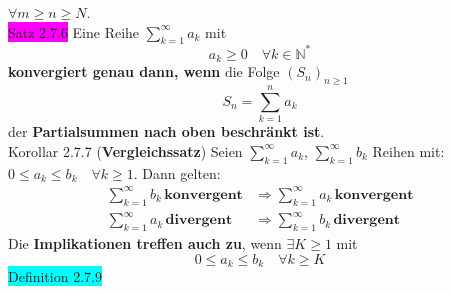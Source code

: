 \documentclass[landscape, 10pt]{article}
\newcommand{\N}{\mathbb{N}}
\begin{document}
\begin{multicols}{3}
{                     $\forall m\geqslant n\geqslant N$}.\\
              \colorbox{magenta}{Satz 2.7.6} 
                     Eine Reihe \textcolor{NavyBlue}{
                     $\sum_{k=1}^\infty a_k$} mit 
                     \begin{equation*}
                            a_k\geqslant0\quad\forall k\in\N^*
                     \end{equation*}
                     \textbf{konvergiert genau dann, wenn} 
                     die Folge 
                     \textcolor{NavyBlue}{
                     $(S_n)_{n\geqslant1}$}
                     \begin{equation*}
                            S_n=\sum_{k=1}^n a_k
                     \end{equation*}
                     der \textbf{Partialsummen nach 
                     oben beschränkt ist}.\\
              \colorbox{BurntOrange}{Korollar 2.7.7} 
              (\textbf{Vergleichssatz}) 
                     Seien \textcolor{NavyBlue}{
                     $\sum_{k=1}^\infty a_k$}, 
                     \textcolor{NavyBlue}{
                     $\sum_{k=1}^\infty b_k$} 
                     Reihen mit: 
                     \textcolor{NavyBlue}{
                     $0\leqslant a_k\leqslant b_k\quad
                     \forall k\geqslant1$}. 
                     Dann gelten:
                     \begin{align*}
                            \sum_{k=1}^\infty b_k\,
                            \textbf{konvergent}
                            &\Longrightarrow 
                            \sum_{k=1}^\infty a_k\,
                            \textbf{konvergent}\\
                            \sum_{k=1}^\infty a_k\,
                            \textbf{divergent} 
                            &\Longrightarrow 
                            \sum_{k=1}^\infty b_k\,
                            \textbf{divergent} 
                     \end{align*}
                     Die \textbf{Implikationen treffen auch zu}, 
                     wenn \textcolor{NavyBlue}{
                     $\exists K\geqslant1$} mit 
                     \begin{equation*}
                            0\leqslant a_k\leqslant b_k\quad
                            \forall k\geqslant K
                     \end{equation*}
              \colorbox{cyan}{Definition 2.7.9} 

\end{multicols}
\end{document}
